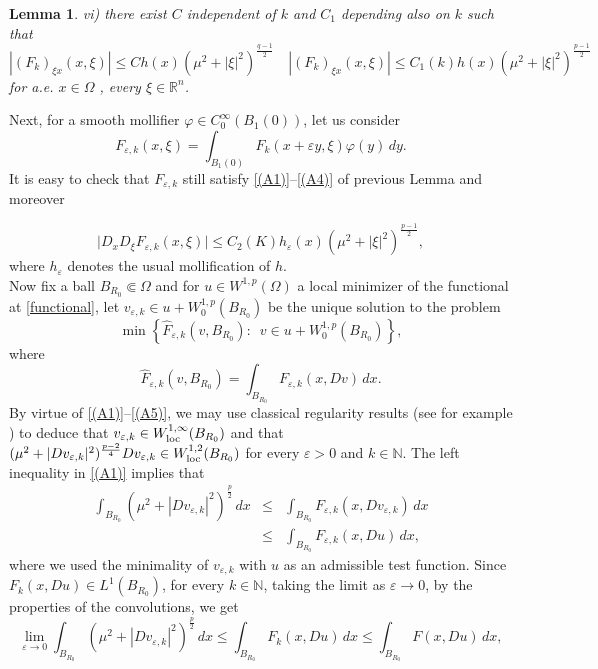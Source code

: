 \documentclass[12pt]{amsart}
\newtheorem{lemma}[theorem]{Lemma}
\theoremstyle{definition}
\numberwithin{equation}{section}
\numberwithin{equation}{section}
\begin{document}
{\begin{lemma}
vi)  there exist $C$ independent of $k$ and $C_1$ depending also on $k$ such that
\begin{equation}
\label{(A4)}
|(F_k)_{\xi x}(x, \xi)| \le C h(x) (\mu^2 + |\xi|^2)^{\frac{q-1}{2}} \quad |(F_k)_{\xi x}(x, \xi)| \le C_1(k) h(x) (\mu^2 + |\xi|^2)^{\frac{p-1}{2}}  
\end{equation}
for a.e. $x\in \Omega$ , every $\xi\in \mathbb{R}^n$.

\end{lemma}
Next, for a smooth mollifier $\varphi\in C^\infty_0(B_1(0))$, let us consider 
$$F_{\varepsilon,k}(x,\xi)=\int_{B_{1}(0)} F_k(x+\varepsilon y, \xi)\varphi(y)\,dy.$$
It is easy to check that $F_{\varepsilon,k}$ still satisfy \eqref{(A1)}--\eqref{(A4)} of previous Lemma and moreover 

\begin{equation}
\label{(A5)}
\vert D_xD_\xi F_{\varepsilon,k}(x,\xi)\vert \le C_2( K)h_\varepsilon(x) (\mu^2+|\xi |^2)^{\frac{p-1}{2}},
\end{equation}
where $h_\varepsilon$ denotes the usual mollification of $h$.
\\
Now {fix a ball $B_{R_0}\Subset \Omega$ and} for $u\in W^{1,p}(\Omega)$ a {local} minimizer of the functional {at \eqref{functional}}, let $v_{\varepsilon,k}\in u+W^{1,p}_0(B_{R_0})$ be the unique solution  to the problem
$$\min\left\{\widehat{F}_{\varepsilon,k} (v,B_{R_0}):\,\,\, v\in u+W^{1,p}_0(B_{R_0})\right\},$$
where $$\widehat{F}_{\varepsilon,k} (v,B_{R_0})=\int_{B_{R_0}}F_{\varepsilon,k}(x, Dv)\,dx.$$
By virtue of \eqref{(A1)}--\eqref{(A5)}, we  may use classical regularity results (see for example \cite{Giusti}) to deduce that  $v_{\varepsilon,k}\in W^{1,\infty}_{\rm loc}(B_{R_0})$ and that $(\mu^2+|Dv_{\varepsilon,k}|^2)^{\frac{p-2}{4}}Dv_{\varepsilon,k}\in W^{1,2}_{\rm loc}(B_{R_0})$ for every $\varepsilon>0$ and $k\in \mathbb{N} $.
The left inequality in \eqref{(A1)} implies that
\begin{eqnarray}
 \int_{B_{R_0}}(\mu^2+|Dv_{\varepsilon,k}|^2)^{\frac{p}{2}}\, dx&\le& \int_{B_{R_0}}F_{\varepsilon,k} (x,Dv_{\varepsilon,k})\,dx \label{normaLp} \\[2mm]
&\le& \int_{B_{R_0}}F_{\varepsilon,k} (x,Du)\,dx,  \nonumber
\end{eqnarray}
where we used the minimality of $v_{\varepsilon,k}$ {with $u$ as an admissible test function}.
Since $F_{k} (x,Du)\in L^1(B_{R_0})$, for every $k\in \mathbb{N}$, taking the limit as $\varepsilon\to 0$, by the properties of the convolutions, we get
\[
\lim_{\varepsilon\to 0}\int_{B_{R_0}}(\mu^2+|Dv_{\varepsilon,k}|^2)^{\frac{p}{2}}\, dx \le    \int_{B_{R_0}}F_{k} (x,Du)\,dx \le \int_{B_{R_0}}F (x,Du)\,dx,
\]}
\end{document}
